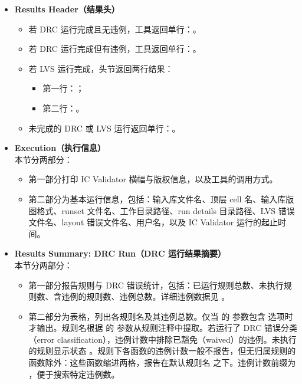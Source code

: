 \begin{itemize}
  \item \textbf{Results Header（结果头）}
  \begin{itemize}
    \item 若 DRC 运行完成且无违例，工具返回单行：。
    \item 若 DRC 运行完成但有违例，工具返回单行：。
    \item 若 LVS 运行完成，头节返回两行结果：
    \begin{itemize}
      \item 第一行：；
      \item 第二行：。
    \end{itemize}
    \item 未完成的 DRC 或 LVS 运行返回单行：。
  \end{itemize}

  \item \textbf{Execution（执行信息）}\\
  本节分两部分：
  \begin{itemize}
    \item 第一部分打印 IC Validator 横幅与版权信息，以及工具的调用方式。
    \item 第二部分为基本运行信息，包括：输入库文件名、顶层 cell 名、输入库版图格式、runset 文件名、工作目录路径、run details 目录路径、LVS 错误文件名、layout 错误文件名、用户名，以及 IC Validator 运行的起止时间。
  \end{itemize}

  \item \textbf{Results Summary: DRC Run（DRC 运行结果摘要）}\\
  本节分两部分：
  \begin{itemize}
    \item 第一部分报告规则与 DRC 错误统计，包括：已运行规则总数、未执行规则数、含违例的规则数、违例总数。详细违例数据见 。
    \item 第二部分为表格，列出各规则名及其违例总数。仅当  的  参数包含  选项时才输出。规则名根据  的  参数从规则注释中提取。若运行了 DRC 错误分类（error classification），违例计数中排除已豁免（waived）的违例。未执行的规则显示状态 。规则下各函数的违例计数一般不报告，但无归属规则的函数除外：这些函数缩进两格，报告在默认规则名  之下。违例计数前缀为 ，便于搜索特定违例数。
  \end{itemize}


\end{itemize}
